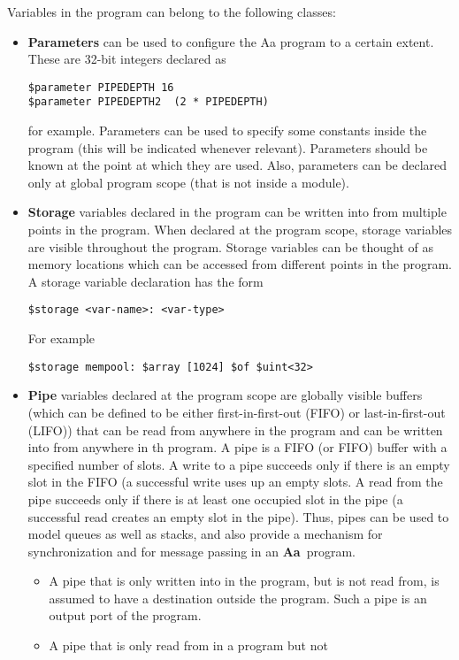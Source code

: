 \documentclass{article}
\newcommand{\Aa}{{\bf Aa}~}
\begin{document}
Variables in  the program can belong to the following classes:
\begin{itemize}
\item {\bf Parameters} can be used to configure the Aa program to
a certain extent.  These are 32-bit integers declared as
\begin{verbatim}
$parameter PIPEDEPTH 16
$parameter PIPEDEPTH2  (2 * PIPEDEPTH) 
\end{verbatim}
for example.  
Parameters can be used to specify some 
constants inside
the program (this will be indicated whenever relevant).
Parameters
should be known at the point at which they are used.  Also,
parameters can be declared only at global program scope (that is
not inside a module).
\item {\bf Storage} variables declared in the program
can be written into from multiple
points in the program.  When declared at the program
scope, storage variables are visible throughout
the program.  Storage variables can be thought of 
as memory locations which can be accessed from different
points in the program.
A storage variable declaration has the form
\begin{verbatim}
$storage <var-name>: <var-type> 
\end{verbatim}
For example
\begin{verbatim}
$storage mempool: $array [1024] $of $uint<32>
\end{verbatim}
\item {\bf Pipe} variables declared at the program scope
are globally visible buffers (which
can be defined to be either first-in-first-out (FIFO) or
last-in-first-out (LIFO)) that can 
be read from anywhere in the program and can be
written into from anywhere in th program.  A pipe
is a FIFO (or FIFO) buffer with a specified number of
slots.  A write to a pipe succeeds
only if there is an empty slot in the FIFO (a successful
write uses up an empty slots.  A read
from the pipe succeeds only if there is at
least one occupied slot in the pipe (a successful read
creates an empty slot in the pipe). 
Thus, pipes can be used to model queues as
well as stacks, and also provide a mechanism for synchronization and
for message passing in an \Aa program.
\begin{itemize}
\item A pipe that is only written into in the program, but
is not read from, is assumed to have a destination outside
the program.  Such a pipe is an output port of the
program.
\item A pipe that is only read from in a program but not

\end{itemize}
\end{itemize}
\end{document}
